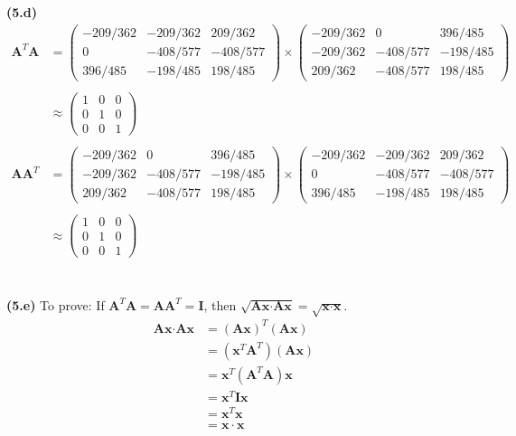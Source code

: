 \documentclass[12pt,letterpaper,fleqn]{article}
\theoremstyle{definition}
\begin{document}
\newpage
\textbf{(5.d)} 
\begin{equation*}
\begin{split}
\textbf{A}^{T}\textbf{A} &=
\begin{pmatrix}
-209/362 &-209/362 &209/362\\
0 &-408/577 &-408/577\\
396/485 &-198/485 &198/485
\end{pmatrix} \times
\begin{pmatrix}
-209/362 &0 &396/485\\
-209/362 &-408/577 &-198/485\\
209/362 &-408/577 &198/485
\end{pmatrix}\\
\\
&\approx \begin{pmatrix}
1 &0 &0\\
0 &1 &0\\
0 &0 &1
\end{pmatrix}\\
\\
\textbf{A}\textbf{A}^{T} &=
\begin{pmatrix}
-209/362 &0 &396/485\\
-209/362 &-408/577 &-198/485\\
209/362 &-408/577 &198/485
\end{pmatrix} \times
\begin{pmatrix}
-209/362 &-209/362 &209/362\\
0 &-408/577 &-408/577\\
396/485 &-198/485 &198/485
\end{pmatrix}\\
\\
&\approx \begin{pmatrix}
1 &0 &0\\
0 &1 &0\\
0 &0 &1
\end{pmatrix}
\end{split}
\end{equation*}
\\
\\
\textbf{(5.e)} To prove: If $\textbf{A}^{T}\textbf{A} = \textbf{A}\textbf{A}^{T} = \textbf{I}$, then $\sqrt{\textbf{Ax} \cdot \textbf{Ax}} = \sqrt{\textbf{x} \cdot \textbf{x}}$.
\begin{equation*}
\begin{split}
\textbf{Ax}\cdot \textbf{Ax} &= \left( \textbf{Ax} \right)^{T} \left( \textbf{Ax}\right)\\
&= \left(\textbf{x}^{T} \textbf{A}^{T}\right) \left( \textbf{A}\textbf{x}\right)\\
&= \textbf{x}^{T} \left( \textbf{A}^{T} \textbf{A} \right) \textbf{x}\\
&= \textbf{x}^{T} \textbf{I} \textbf{x}\\
&= \textbf{x}^{T} \textbf{x}\\
&= \textbf{x} \cdot \textbf{x}
\end{split}
\end{equation*}
\end{document}
